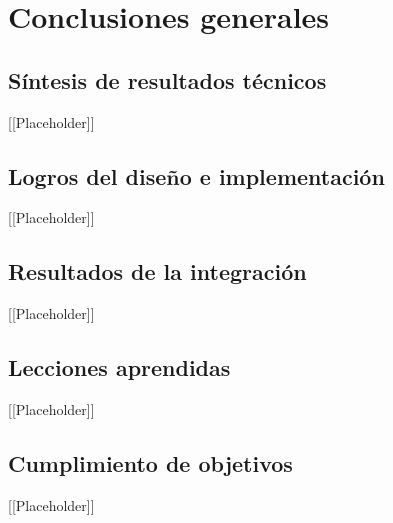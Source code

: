 \chapter{Conclusiones generales}

\section{Síntesis de resultados técnicos}
[[Placeholder]]

\section{Logros del diseño e implementación}
[[Placeholder]]

\section{Resultados de la integración}
[[Placeholder]]

\section{Lecciones aprendidas}
[[Placeholder]]

\section{Cumplimiento de objetivos}
[[Placeholder]]
